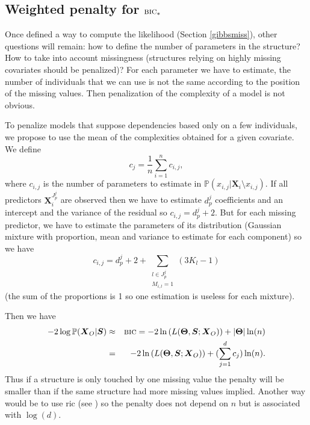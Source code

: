 \documentclass[12pt,a4paper]{report}
\begin{document}
	\subsection{Weighted penalty for $\mbox{{\sc bic}}_*$}
			Once defined a way to compute the likelihood (Section \ref{gibbsmiss}), other questions will remain: how to define the number of parameters in the structure? How to take into account missingness (structures relying on highly missing covariates should be penalized)?
			For each parameter we have to estimate, the number of individuals that we can use is not the same according to the position of the missing values. Then penalization of the complexity of a model is not obvious.
			
			To penalize models that suppose dependencies based only on a few individuals, we propose to use the mean of the complexities obtained for a given covariate. We define
			\begin{equation}
			c_j=\frac{1}{n}\sum_{i=1}^nc_{i,j},  \nonumber 
\end{equation}						where $c_{i,j}$ is the number of parameters to estimate in $\mathbb{P}(x_{i,j}|\boldsymbol{X}_i\setminus x_{i,j})$. If all predictors $\boldsymbol{X}^{J_p^j}_i$ are observed then we have to estimate $d_p^j$ coefficients and an intercept and the variance of the residual so  $c_{i,j}=d_p^j+2$. But for each missing predictor, we have to estimate the parameters of its distribution (Gaussian mixture with proportion, mean and variance to estimate for each component) so we have $$c_{i,j}=d_p^j+2 + \sum_{\substack{l \in J_p^j \\ M_{i,l}=1}} (3 K_l-1)$$  (the sum of the proportions is 1 so one estimation is useless for each mixture).

 Then we have
			\begin{eqnarray}
		-2\log \mathbb{P}(\boldsymbol{X}_O|\boldsymbol{S})&\approx & \mbox{{\sc bic}}=-2\ln\left(L(\boldsymbol{\Theta},\boldsymbol{S};\boldsymbol{X}_O)\right)+|\boldsymbol{\Theta}|\ln(n) \nonumber  \\
		&=& -2\ln\left(L(\boldsymbol{\Theta},\boldsymbol{S};\boldsymbol{X}_O)\right)+(\sum_{j=1}^dc_j)\ln(n). \nonumber 
	\end{eqnarray}
			 Thus if a structure is only touched by one missing value the penalty will be smaller than if the same structure had more missing values implied.
			Another way would be to use {\sc ric} (see \cite{foster1994risk}) so the penalty does not depend on $n$ but is associated with $\log(d)$. %
		
\end{document}
